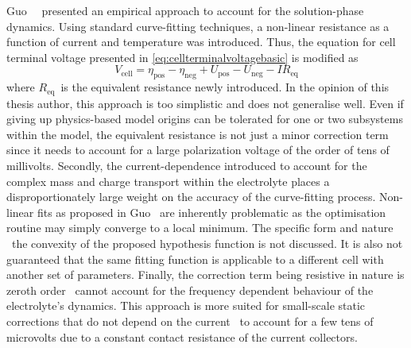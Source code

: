 Guo~\etal~\cite{Guo2011a}  presented an  empirical approach  to account  for the
solution-phase dynamics.  Using standard curve-fitting techniques,  a non-linear
resistance as  a function of current  and temperature was introduced.  Thus, the
equation for cell terminal voltage presented
in \cref{eq:cellterminalvoltagebasic} is modified as
\begin{equation}
    V_\text{cell} = η_\text{pos} - η_\text{neg} + U_\text{pos} - U_\text{neg} - I R_\text{eq}
\end{equation}
where  $R_\text{eq}$~is  the  equivalent  resistance newly  introduced.  In  the
opinion of  this thesis  author, this  approach is too  simplistic and  does not
generalise well. Even if giving up  physics-based model origins can be tolerated
for one  or two subsystems  within the model,  the equivalent resistance  is not
just a minor correction term since it  needs to account for a large polarization
voltage of  the order  of tens of  millivolts. Secondly,  the current-dependence
introduced  to account  for the  complex mass  and charge  transport within  the
electrolyte  places a  disproportionately large  weight on  the accuracy  of the
curve-fitting process. Non-linear fits as proposed in Guo~\etal{} are inherently
problematic  as  the optimisation  routine may  simply converge  to a  local
minimum.  The  specific  form  and  nature \eg~the  convexity  of  the  proposed
hypothesis  function is  not  discussed.  It is  also  not  guaranteed that  the
same  fitting function  is  applicable  to a  different  cell  with another  set
of  parameters.  Finally, the  correction  term  being  resistive in  nature  is
zeroth order  \ie~cannot account  for the frequency  dependent behaviour  of the
electrolyte's  dynamics. This  approach is  more suited  for small-scale  static
corrections that do not  depend on the current \eg~to account for  a few tens of
microvolts due to a constant contact resistance of the current collectors.


